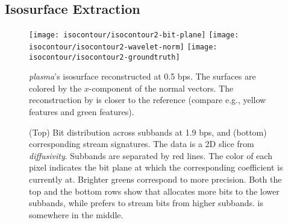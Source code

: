 \subsection{Isosurface Extraction}\label{sec:isocontour}

\begin{figure}[t]
\centering
{}
{\texttt{[image: isocontour/isocontour2-bit-plane]}}
{\texttt{[image: isocontour/isocontour2-wavelet-norm]}}
{\texttt{[image: isocontour/isocontour2-groundtruth]}}
\caption{\emph{plasma}'s isosurface reconstructed at 0.5 bps. The surfaces are colored by the
$x$-component of the normal vectors. The reconstruction by \sbit is closer to the reference (compare
e.g., yellow features and green features).}
\label{fig:isocontour-surfaces-plasma}
\end{figure}

\begin{figure}[t]
\centering
\caption{(Top) Bit distribution across subbands at 1.9 bps, and (bottom) corresponding stream
signatures. The data is a 2D slice from \emph{diffusivity}. Subbands are separated by red lines. The
color of each pixel indicates the bit plane at which the corresponding coefficient is currently at.
Brighter greens correspond to more precision. Both the top and the bottom rows show that \shsg
allocates more bits to the lower subbands, while \slsg prefers to stream bits from higher subbands.
\ssig is somewhere in the middle.}
\label{fig:bit-distrib}
\end{figure}

